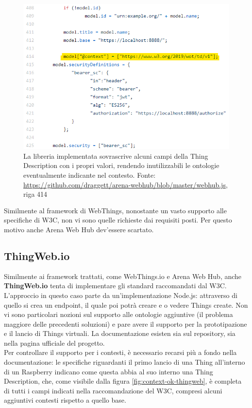 \documentclass[12pt,a4paper,openright,oneside]{report}
\begin{document}
\begin{figure}[h]
	\centering
	\includegraphics[scale=1]{eps/context_overwritten.png}
	\caption{La libreria implementata sovrascrive alcuni campi della Thing Description con i propri valori, rendendo inutilizzabili le ontologie eventualmente indicante nel contesto. Fonte: \url{https://github.com/draggett/arena-webhub/blob/master/webhub.js}, riga 414}
	\label{fig:context-overwritten}
\end{figure}

Similmente al framework di WebThings, nonostante un vasto supporto alle specifiche di W3C, non vi sono quelle richieste dai requisiti posti. Per questo motivo anche Arena Web Hub dev'essere scartato.


\clearpage
\subsection{ThingWeb.io}
Similmente ai framework trattati, come WebThings.io e Arena Web Hub, anche \textbf{ThingWeb.io} \cite{thingweb} tenta di implementare gli standard raccomandati dal W3C. L'approccio in questo caso parte da un'implementazione Node.js: attraverso di quello si crea un endpoint, il quale poi potrà creare e o vedere Things create. Non vi sono particolari nozioni sul supporto alle ontologie aggiuntive (il problema maggiore delle precedenti soluzioni) e pare avere il supporto per la prototipazione e il lancio di Things virtuali. La documentazione esisten sia sul repository, sia nella pagina ufficiale del progetto.\\

Per controllare il supporto per i contesti, è necessario recarsi più a fondo nella documentazione: le specifiche riguardanti il primo lancio di una Thing all'interno di un Raspberry indicano come questa abbia al suo interno una Thing Description, che, come visibile dalla figura \ref{fig:context-ok-thingweb}, è completa di tutti i campi indicati nella raccomandazione del W3C, compresi alcuni aggiuntivi contesti rispetto a quello base.\\
\end{document}
